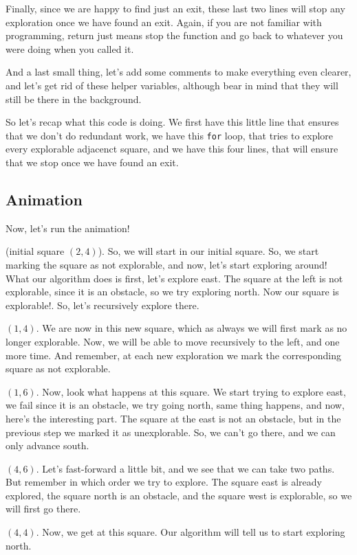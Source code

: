 \documentclass[12pt]{article}
\begin{document}
Finally, since we are happy to find just an exit, these last two
lines will stop any exploration once we have found
an exit. Again, if you are not familiar with programming,
return just means stop the function and go back to whatever
you were doing when you called it.

And a last small thing, let's add some comments to make
everything even clearer, and let's get rid of these
helper variables, although bear in mind that they will
still be there in the background.

So let's recap what this code is doing. We first have this
little line that ensures that we don't do redundant work,
we have this \verb|for| loop, that tries to explore
every explorable adjacenct square,
and we have this four lines, that will ensure that we stop
once we have found an exit.

\subsection{Animation}

Now, let's run the animation!

(initial square $(2, 4)$). So, we will start in our
initial square. So, we start marking the square as not
explorable, and now, let's start exploring around!
What our algorithm does is first, let's explore east.
The square at the left is not explorable, since it is an obstacle,
so we try exploring north. Now our square is explorable!. So,
let's recursively explore there.

$(1, 4)$. We are now in this new square,
which as always we will first mark as no longer explorable.
Now, we will be able to move recursively to the left,
and one more time. And remember, at each new exploration we
mark the corresponding square as not explorable.

$(1, 6)$. Now, look what happens at this square. We start
trying to explore east, we fail since it is an obstacle,
we try going north, same thing happens, and now, here's
the interesting part. The square at the east is not an obstacle,
but in the previous step we marked it as unexplorable. So,
we can't go there, and we can only advance south.

$(4, 6)$. Let's fast-forward a little bit, and we see that we
can take two paths. But remember in which order we try to explore.
The square east is already explored, the square north is an
obstacle, and the square west is explorable, so we will
first go there.

$(4, 4)$. Now, we get at this square. Our algorithm will tell
us to start exploring north.
\end{document}
